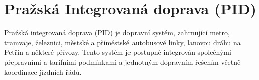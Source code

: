 \chapter{Pražská Integrovaná doprava (PID)}
\label{3-teorie-pid}

Pražská integrovaná doprava (PID) je dopravní systém, zahrnující metro, 
tramvaje, železnici, městské a příměstské autobusové linky, lanovou dráhu
na Petřín a některé přívozy. Tento systém je postupně integrován společnými 
přepravními a tarifními podmínkami a jednotným dopravním řešením včetně 
koordinace jízdních řádů. \cite{pid}

